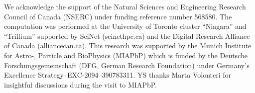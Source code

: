 \documentclass[twocolumn]{aastex631}
\begin{document}
\begin{acknowledgments}

We acknowledge the support of the Natural Sciences and Engineering Research Council of Canada (NSERC) under funding reference number 568580.
The computation was performed at the University of Toronto cluster ``Niagara'' and ``Trillium'' supported by SciNet (scinethpc.ca) and the Digital Research Alliance of Canada (alliancecan.ca). This research was supported by the Munich Institute for Astro-, Particle and BioPhysics (MIAPbP) which is funded by the Deutsche Forschungsgemeinschaft (DFG, German Research Foundation) under Germany's Excellence Strategy--EXC-2094--390783311. YS thanks Marta Volonteri for insightful discussions during the visit to MIAPbP.
\end{acknowledgments}

%

\vspace{5mm}

\end{document}
